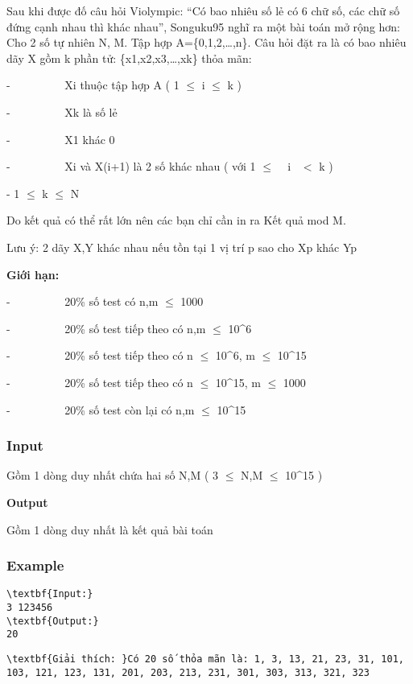 



   Sau khi được đố câu hỏi Violympic: “Có bao nhiêu số lẻ có 6 chữ số, các chữ số đứng cạnh nhau thì khác nhau”, Songuku95 nghĩ ra một bài toán mở rộng hơn:   
\\   Cho 2 số tự nhiên N, M. Tập hợp A=\{0,1,2,…,n\}. Câu hỏi đặt ra là có bao nhiêu dãy X gồm k phần tử: \{x1,x2,x3,…,xk\} thỏa mãn:  

   -          Xi thuộc tập hợp A ( 1  $\le$  i  $\le$  k )  

   -          Xk là số lẻ  

   -          X1 khác 0  

   -          Xi và X(i+1) là 2 số khác nhau ( với 1  $\le$   i  $<$ k )   

    -      1  $\le$  k  $\le$  N  

   Do kết quả có thể rất lớn nên các bạn chỉ cần in ra Kết quả mod M.  

   Lưu ý: 2 dãy X,Y khác nhau nếu tồn tại 1 vị trí p sao cho Xp khác Yp  

\textbf{    Giới hạn:   }

   -          20\% số test có n,m  $\le$  1000  

   -          20\% số test tiếp theo có n,m  $\le$  10^6  

   -          20\% số test tiếp theo có n  $\le$  10^6, m  $\le$  10^15  

   -          20\% số test tiếp theo có n  $\le$  10^15, m  $\le$  1000  

   -          20\% số test còn lại có n,m  $\le$  10^15  

\subsubsection{   Input  }

   Gồm 1 dòng duy nhất chứa hai số N,M ( 3  $\le$  N,M  $\le$  10^15 )  

\textbf{     Output    }

   Gồm 1 dòng duy nhất là kết quả bài toán  



\subsubsection{   Example  }
\begin{verbatim}
\textbf{Input:}
3 123456
\textbf{Output:}
20\end{verbatim}
\begin{verbatim}
\textbf{Giải thích: }Có 20 số thỏa mãn là: 1, 3, 13, 21, 23, 31, 101, 103, 121, 123, 131, 201, 203, 213, 231, 301, 303, 313, 321, 323\end{verbatim}
